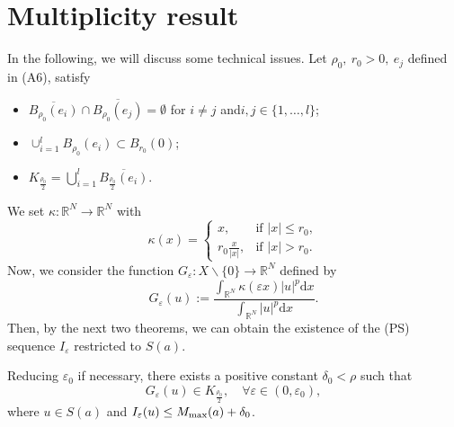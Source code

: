 \documentclass[reqno]{amsart}
\begin{document}
\section{Multiplicity result}

In the following, we will discuss some technical issues. 
Let $\rho_0,~r_0> 0,~e_j$ defined in (A6), satisfy
\begin{itemize}
\item $\overline{B_{\rho_{0}}(e_i)}\cap\overline{B_{\rho_{0}}(e_j)}=\emptyset$
for $i\neq j$ and$i,j\in{\{1,\dots,l\}}$;

\item $\cup_{i=1}^{l}B_{\rho_{0}}(e_i)\subset B_{r_{0}}(0)$;

\item $K_{\frac{\rho_0}{2}}=\bigcup_{i=1}^{l}\overline {B_{\frac{\rho_{0}}{2}}(e_i)}$.
\end{itemize}
We set $\kappa:\mathbb{R}^N\to\mathbb{R}^N$ with
$$
\kappa(x)= \begin{cases}
x, &\text{if }|x|\le r_0,\\
r_0\frac{x}{|x|}, &\text{if }|x|>r_0.
\end{cases}
$$
Now, we consider the function $G_\varepsilon : X\backslash\{0\} \to \mathbb{R}^N$ 
defined by
$$
G_\varepsilon(u):=\frac{\int_{\mathbb{R}^N}\kappa(\varepsilon x)|u|^{p}
\mathrm{d}x}{\int_{\mathbb{R}^N}|u|^{p}\mathrm{d}x}.
$$
Then, by the next two theorems, we can obtain the existence of the (PS) sequence
 $I_\varepsilon$ restricted to $S(a)$.

\begin{lemma}\label{lem:4.1}
Reducing $\varepsilon_0$ if necessary, there exists a positive constant 
$\delta_0 < \rho$ such that
$$
G_\varepsilon(u) \in K_{\frac{\rho_0}{2}},\quad\forall \varepsilon\in(0,\varepsilon_0),
$$ 
where $u\in S(a)$ and $I_\varepsilon(u)\le M_{\rm max}(a)+\delta_0$.
\end{lemma}
\end{document}
